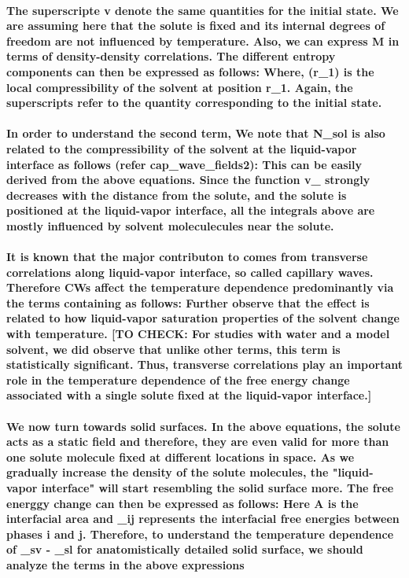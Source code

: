 \documentclass[a4paper,12pt,single,pdftex]{scrartcl}
\begin{document}
{\label{ID_349834534}\paragraph{The superscripte v denote the same quantities for the initial state. We are assuming here that the solute is fixed and its internal degrees of freedom are not influenced by temperature. Also, we can express M in terms of density-density correlations. The different entropy components can then be expressed as follows: Where, \chi (r_1) is the local compressibility of the solvent at position r_1. Again, the superscripts  refer to the quantity corresponding to the initial state.}

\label{ID_1103070320}\paragraph{In order to understand the second term, We note that \Delta N_{sol} is also related to the compressibility of the solvent at the liquid-vapor interface as follows (refer cap_wave_fields2):  This can be easily derived from the above equations. Since the function v_{\Psi} strongly decreases with the distance from the solute, and the solute is positioned at the liquid-vapor interface, all the integrals above are mostly influenced by solvent moleculecules near the solute.}

\label{ID_1305040262}\paragraph{ It is known that the major contributon to \chi comes from transverse correlations along liquid-vapor interface, so called capillary waves. Therefore CWs affect the temperature dependence predominantly via the terms containing \chi as follows: Further observe that the effect is related to how liquid-vapor saturation properties of the solvent change with temperature. [TO CHECK: For studies with water and a model solvent, we did observe that unlike other terms, this term is statistically significant. Thus, transverse correlations play an important role in the temperature dependence of the free energy change associated with a single solute fixed at the liquid-vapor interface.]}

\label{ID_276381896}\paragraph{ We now turn towards solid surfaces. In the above equations, the solute acts as a static field and therefore, they are even valid for more than one solute molecule fixed at different locations in space. As we gradually increase the density of the solute molecules, the "liquid-vapor interface" will start  resembling the solid surface more. The free energgy change \Delta \mu can then be expressed as follows: Here A is the interfacial area and \gamma_{ij} represents the interfacial free energies between phases i and j. Therefore, to understand the temperature dependence of \gamma_{sv} - \gamma_{sl} for anatomistically detailed solid surface, we should analyze the terms in the above expressions}

}
\end{document}

